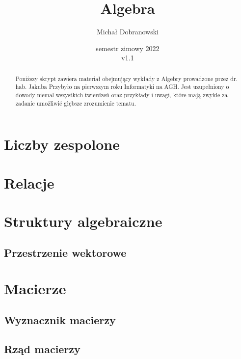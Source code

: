 \documentclass[polish,pretty]{angav}
\title{Algebra}
\author{Michał Dobranowski}
\date{semestr zimowy 2022 \\ v1.1}
\begin{document}
    \maketitle
    \begin{abstract}
        \noindent Poniższy skrypt zawiera materiał obejmujący wykłady z Algebry prowadzone przez dr. hab. Jakuba Przybyło na pierwszym roku Informatyki na AGH. Jest uzupełniony o dowody niemal wszystkich twierdzeń oraz przykłady i uwagi, które mają zwykle za zadanie umożliwić głębsze zrozumienie tematu.
    \end{abstract}
    \vspace*{\fill}
    {\footnotesize\doclicenseThis}
    \newpage

    \tableofcontents
    \newpage

    \section{Liczby zespolone}
    

    \section{Relacje}
    

    \section{Struktury algebraiczne}
    

        \subsection{Przestrzenie wektorowe}
        

    \section{Macierze}
    

        \subsection{Wyznacznik macierzy}
        

        \subsection{Rząd macierzy}
        
\end{document}
